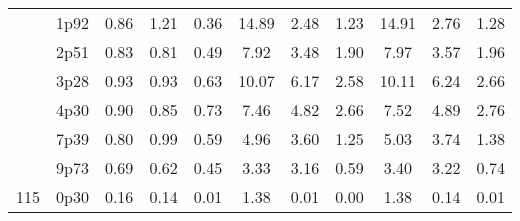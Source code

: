 \documentclass[12pt,A4paper]{article}
\begin{document}
\begin{table}[]
\begin{tabular}{lllllllllll}
\multicolumn{1}{|l|}{} & \multicolumn{1}{l|}{1p92} & \multicolumn{1}{c|}{0.86}        & \multicolumn{1}{c|}{1.21}         & \multicolumn{1}{c|}{0.36}        & \multicolumn{1}{c|}{14.89}         & \multicolumn{1}{c|}{2.48}        & \multicolumn{1}{c|}{1.23}        & \multicolumn{1}{c|}{14.91}        & \multicolumn{1}{c|}{2.76}        & \multicolumn{1}{c|}{1.28}         \\ \cline{2-11}
\multicolumn{1}{|l|}{} & \multicolumn{1}{l|}{2p51} & \multicolumn{1}{c|}{0.83}        & \multicolumn{1}{c|}{0.81}         & \multicolumn{1}{c|}{0.49}        & \multicolumn{1}{c|}{7.92}         & \multicolumn{1}{c|}{3.48}        & \multicolumn{1}{c|}{1.90}        & \multicolumn{1}{c|}{7.97}        & \multicolumn{1}{c|}{3.57}        & \multicolumn{1}{c|}{1.96}         \\ \cline{2-11}
\multicolumn{1}{|l|}{} & \multicolumn{1}{l|}{3p28} & \multicolumn{1}{c|}{0.93}        & \multicolumn{1}{c|}{0.93}         & \multicolumn{1}{c|}{0.63}        & \multicolumn{1}{c|}{10.07}         & \multicolumn{1}{c|}{6.17}        & \multicolumn{1}{c|}{2.58}        & \multicolumn{1}{c|}{10.11}        & \multicolumn{1}{c|}{6.24}        & \multicolumn{1}{c|}{2.66}         \\ \cline{2-11}
\multicolumn{1}{|l|}{} & \multicolumn{1}{l|}{4p30} & \multicolumn{1}{c|}{0.90}        & \multicolumn{1}{c|}{0.85}         & \multicolumn{1}{c|}{0.73}        & \multicolumn{1}{c|}{7.46}         & \multicolumn{1}{c|}{4.82}        & \multicolumn{1}{c|}{2.66}        & \multicolumn{1}{c|}{7.52}        & \multicolumn{1}{c|}{4.89}        & \multicolumn{1}{c|}{2.76}         \\ \cline{2-11}
\multicolumn{1}{|l|}{} & \multicolumn{1}{l|}{7p39} & \multicolumn{1}{c|}{0.80}        & \multicolumn{1}{c|}{0.99}         & \multicolumn{1}{c|}{0.59}        & \multicolumn{1}{c|}{4.96}         & \multicolumn{1}{c|}{3.60}        & \multicolumn{1}{c|}{1.25}        & \multicolumn{1}{c|}{5.03}        & \multicolumn{1}{c|}{3.74}        & \multicolumn{1}{c|}{1.38}         \\ \cline{2-11}
\multicolumn{1}{|l|}{} & \multicolumn{1}{l|}{9p73} & \multicolumn{1}{c|}{0.69}        & \multicolumn{1}{c|}{0.62}         & \multicolumn{1}{c|}{0.45}        & \multicolumn{1}{c|}{3.33}         & \multicolumn{1}{c|}{3.16}        & \multicolumn{1}{c|}{0.59}        & \multicolumn{1}{c|}{3.40}        & \multicolumn{1}{c|}{3.22}        & \multicolumn{1}{c|}{0.74}         \\ \hline
\multicolumn{1}{|l|}{\multirow{12}{*}{115}} & \multicolumn{1}{l|}{0p30} & \multicolumn{1}{c|}{0.16}        & \multicolumn{1}{c|}{0.14}         & \multicolumn{1}{c|}{0.01}        & \multicolumn{1}{c|}{1.38}         & \multicolumn{1}{c|}{0.01}        & \multicolumn{1}{c|}{0.00}         & \multicolumn{1}{c|}{1.38}         & \multicolumn{1}{c|}{0.14}         & \multicolumn{1}{c|}{0.01}         \\ \cline{2-11} 

\end{tabular}
\end{table}
\end{document}
